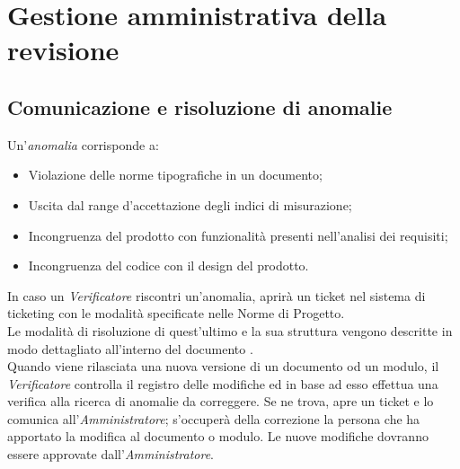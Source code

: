\section{Gestione amministrativa della revisione}{
\subsection{Comunicazione e risoluzione di anomalie}{
Un'\textit{anomalia} corrisponde a:
\begin{itemize}
	\item Violazione delle norme tipografiche in un documento;
	\item Uscita dal range d'accettazione degli indici di misurazione;
	\item Incongruenza del prodotto con funzionalità presenti nell'analisi dei requisiti;
	\item Incongruenza del codice con il design del prodotto.
\end{itemize}

In caso un \emph{Verificatore} riscontri un'anomalia, aprirà un ticket nel sistema di ticketing con le modalità specificate nelle Norme di Progetto. \\
Le modalità di risoluzione di quest'ultimo e la sua struttura vengono descritte in modo dettagliato all'interno del documento \href{run:../../Interni/\fNormeDiProgetto}{\fEscapeNormeDiProgetto}. \\
Quando viene rilasciata una nuova versione di un documento od un modulo, il \emph{Verificatore} controlla il registro delle modifiche ed in base ad esso effettua una verifica alla ricerca di anomalie da correggere. Se ne trova, apre un ticket e lo comunica all'\emph{Amministratore}; s'occuperà della correzione la persona che ha apportato la modifica al documento o modulo. Le nuove modifiche dovranno essere approvate dall'\emph{Amministratore}.
}
}